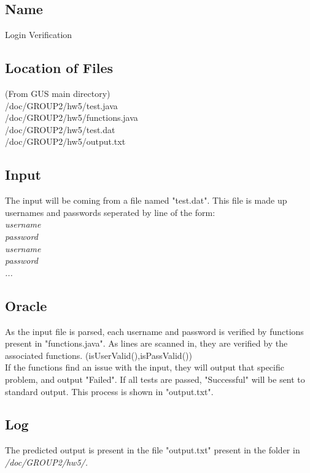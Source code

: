 \documentclass[12pt]{article}
\begin{document}
\subsection{Name}
Login Verification
\subsection{Location of Files}
(From GUS main directory)\\
/doc/GROUP2/hw5/test.java\\
/doc/GROUP2/hw5/functions.java\\
/doc/GROUP2/hw5/test.dat\\
/doc/GROUP2/hw5/output.txt
\subsection{Input}
The input will be coming from a file named "test.dat". This file is made up usernames and passwords seperated by line of the form:\\
\emph{username}\\
\emph{password}\\
\emph{username}\\
\emph{password}\\
\emph{...}
\subsection{Oracle}
As the input file is parsed, each username and password is verified by functions present in "functions.java". As lines are scanned in, they are verified by the
associated functions. (isUserValid(),isPassValid())\\
If the functions find an issue with the input, they will output that specific problem, and output "Failed". If all tests are passed, "Successful" will be sent to standard output.
This process is shown in "output.txt".
\subsection{Log}
The predicted output is present in the file "output.txt" present in the folder in \emph{/doc/GROUP2/hw5/.}
\end{document}
